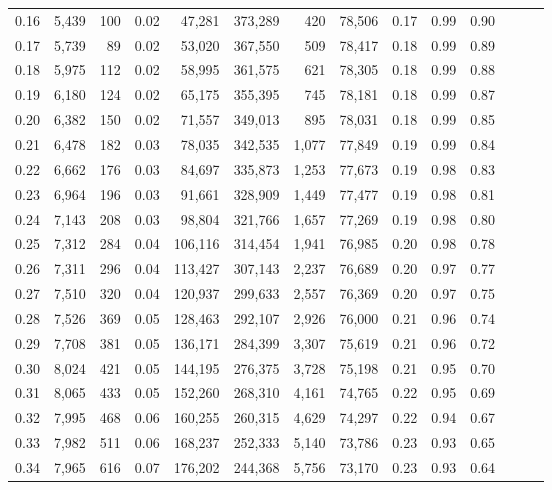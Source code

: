 \begin{tabular}{rrrrrrrrrrrrrr}
0.16 &  5,439 &    100 &  0.02 &   47,281 &  373,289 &     420 &  78,506 &  0.17 &  0.99 &      0.90 \\
0.17 &  5,739 &     89 &  0.02 &   53,020 &  367,550 &     509 &  78,417 &  0.18 &  0.99 &      0.89 \\
0.18 &  5,975 &    112 &  0.02 &   58,995 &  361,575 &     621 &  78,305 &  0.18 &  0.99 &      0.88 \\
0.19 &  6,180 &    124 &  0.02 &   65,175 &  355,395 &     745 &  78,181 &  0.18 &  0.99 &      0.87 \\
0.20 &  6,382 &    150 &  0.02 &   71,557 &  349,013 &     895 &  78,031 &  0.18 &  0.99 &      0.85 \\
0.21 &  6,478 &    182 &  0.03 &   78,035 &  342,535 &   1,077 &  77,849 &  0.19 &  0.99 &      0.84 \\
0.22 &  6,662 &    176 &  0.03 &   84,697 &  335,873 &   1,253 &  77,673 &  0.19 &  0.98 &      0.83 \\
0.23 &  6,964 &    196 &  0.03 &   91,661 &  328,909 &   1,449 &  77,477 &  0.19 &  0.98 &      0.81 \\
0.24 &  7,143 &    208 &  0.03 &   98,804 &  321,766 &   1,657 &  77,269 &  0.19 &  0.98 &      0.80 \\
0.25 &  7,312 &    284 &  0.04 &  106,116 &  314,454 &   1,941 &  76,985 &  0.20 &  0.98 &      0.78 \\
0.26 &  7,311 &    296 &  0.04 &  113,427 &  307,143 &   2,237 &  76,689 &  0.20 &  0.97 &      0.77 \\
0.27 &  7,510 &    320 &  0.04 &  120,937 &  299,633 &   2,557 &  76,369 &  0.20 &  0.97 &      0.75 \\
0.28 &  7,526 &    369 &  0.05 &  128,463 &  292,107 &   2,926 &  76,000 &  0.21 &  0.96 &      0.74 \\
0.29 &  7,708 &    381 &  0.05 &  136,171 &  284,399 &   3,307 &  75,619 &  0.21 &  0.96 &      0.72 \\
0.30 &  8,024 &    421 &  0.05 &  144,195 &  276,375 &   3,728 &  75,198 &  0.21 &  0.95 &      0.70 \\
0.31 &  8,065 &    433 &  0.05 &  152,260 &  268,310 &   4,161 &  74,765 &  0.22 &  0.95 &      0.69 \\
0.32 &  7,995 &    468 &  0.06 &  160,255 &  260,315 &   4,629 &  74,297 &  0.22 &  0.94 &      0.67 \\
0.33 &  7,982 &    511 &  0.06 &  168,237 &  252,333 &   5,140 &  73,786 &  0.23 &  0.93 &      0.65 \\
0.34 &  7,965 &    616 &  0.07 &  176,202 &  244,368 &   5,756 &  73,170 &  0.23 &  0.93 &      0.64 \\

\end{tabular}
